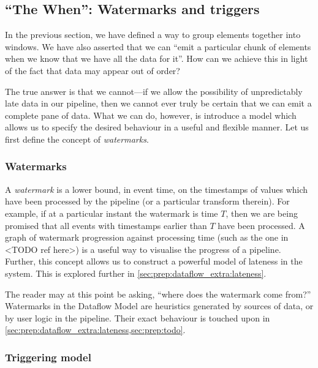 

\subsection{``The When'': Watermarks and triggers}

In the previous section, we have defined a way to group elements together into windows.
We have also asserted that we can ``emit a particular chunk of elements when we know that we have all the data for it''.
How can we achieve this in light of the fact that data may appear out of order?

The true answer is that we cannot---if we allow the possibility of unpredictably late data in our pipeline, then we cannot ever truly be certain that we can emit a complete pane of data.
What we can do, however, is introduce a model which allows us to specify the desired behaviour in a useful and flexible manner.
Let us first define the concept of \emph{watermarks}.

\subsubsection{Watermarks}

A \emph{watermark} is a lower bound, in event time, on the timestamps of values which have been processed by the pipeline (or a particular transform therein).
For example, if at a particular instant the watermark is time $T$, then we are being promised that all events with timestamps earlier than $T$ have been processed.
A graph of watermark progression against processing time (such as the one in <TODO ref here>) is a useful way to visualise the progress of a pipeline.
Further, this concept allows us to construct a powerful model of lateness in the system.
This is explored further in \cref{sec:prep:dataflow_extra:lateness}.


The reader may at this point be asking, ``where does the watermark come from?''
Watermarks in the Dataflow Model are heuristics generated by sources of data, or by user logic in the pipeline.
Their exact behaviour is touched upon in \cref{sec:prep:dataflow_extra:lateness,sec:prep:todo}.

\subsubsection{Triggering model}

